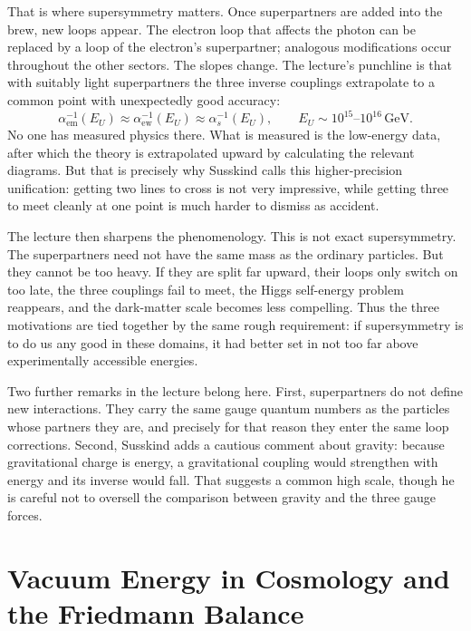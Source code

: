 That is where supersymmetry matters. Once superpartners are added into the brew, new loops appear. The electron loop that affects the photon can be replaced by a loop of the electron's superpartner; analogous modifications occur throughout the other sectors. The slopes change. The lecture's punchline is that with suitably light superpartners the three inverse couplings extrapolate to a common point with unexpectedly good accuracy:
\begin{equation}
\alpha_{\mathrm{em}}^{-1}(E_U)\approx
\alpha_{\mathrm{ew}}^{-1}(E_U)\approx
\alpha_s^{-1}(E_U),
\qquad
E_U\sim 10^{15}\text{--}10^{16}\,\mathrm{GeV}.
\end{equation}
No one has measured physics there. What is measured is the low-energy data, after which the theory is extrapolated upward by calculating the relevant diagrams. But that is precisely why Susskind calls this higher-precision unification: getting two lines to cross is not very impressive, while getting three to meet cleanly at one point is much harder to dismiss as accident.

The lecture then sharpens the phenomenology. This is not exact supersymmetry. The superpartners need not have the same mass as the ordinary particles. But they cannot be too heavy. If they are split far upward, their loops only switch on too late, the three couplings fail to meet, the Higgs self-energy problem reappears, and the dark-matter scale becomes less compelling. Thus the three motivations are tied together by the same rough requirement: if supersymmetry is to do us any good in these domains, it had better set in not too far above experimentally accessible energies.

Two further remarks in the lecture belong here. First, superpartners do not define new interactions. They carry the same gauge quantum numbers as the particles whose partners they are, and precisely for that reason they enter the same loop corrections. Second, Susskind adds a cautious comment about gravity: because gravitational charge is energy, a gravitational coupling would strengthen with energy and its inverse would fall. That suggests a common high scale, though he is careful not to oversell the comparison between gravity and the three gauge forces.

\section{Vacuum Energy in Cosmology and the Friedmann Balance}

